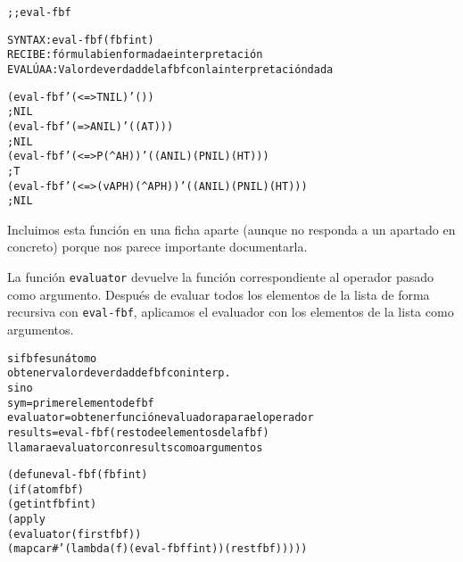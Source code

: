 \begin{aibox}{\function}
\begin{alltt}
;; eval-fbf

SYNTAX: eval-fbf (fbf int)
RECIBE: fórmula bien formada e interpretación
EVALÚA A : Valor de verdad de la fbf con la interpretación dada

\end{alltt}
\end{aibox}

\begin{aibox}{\examples}
\begin{alltt}
(eval-fbf '(<=> T NIL) '())
; NIL
(eval-fbf '(=> A NIL) '((A T)))
; NIL
(eval-fbf '(<=> P (^ A  H)) '((A NIL) (P NIL) (H T)))
; T
(eval-fbf '(<=> (v A P H) (^ A P H)) '((A NIL) (P NIL) (H T)))
; NIL
\end{alltt}

\end{aibox}

\begin{aibox}{\comments}
Incluimos esta función en una ficha aparte (aunque no responda a un apartado en concreto) porque nos parece importante documentarla.

La función \texttt{evaluator} devuelve la función correspondiente al operador pasado como argumento. Después de evaluar todos los elementos de la lista de forma recursiva con \texttt{eval-fbf}, aplicamos el evaluador con los elementos de la lista como argumentos.
\end{aibox}

\begin{aibox}{\pseudocode}
\begin{alltt}
si fbf es un átomo
	obtener valor de verdad de fbf con interp.
si no
	sym = primer elemento de fbf
	evaluator = obtener función evaluadora para el operador
	results = eval-fbf(resto de elementos de la fbf)
	llamar a evaluator con results como argumentos

\end{alltt}
\end{aibox}
\begin{aibox}{\code}

\begin{alltt}
(defun eval-fbf (fbf int)
   	(if (atom fbf)
         (getint fbf int)
         (apply 
           (evaluator (first fbf)) 
           (mapcar #'(lambda (f) (eval-fbf f int)) (rest fbf)))))

\end{alltt}
\end{aibox}
